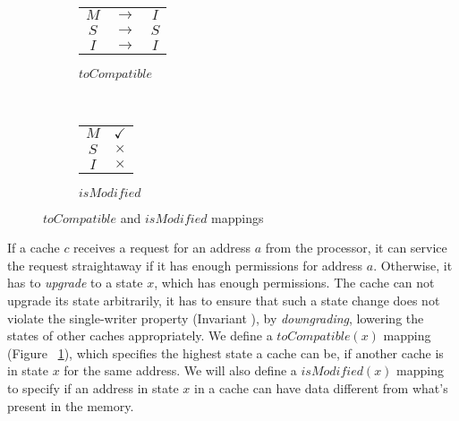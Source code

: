 \begin{wrapfigure}{r}{.46\linewidth}
\begin{subfigure}{.27\linewidth}
\centering
\begin{tabular}{|ccc|}
\hline
$M$ & $\rightarrow$ & $I$\\
$S$ & $\rightarrow$ & $S$\\
$I$ & $\rightarrow$ & $I$\\
\hline
\end{tabular}
\caption{$toCompatible$}
\label{toCompat}
\end{subfigure}
~~~~~~~~~~~~~~
\begin{subfigure}{.21\linewidth}
\centering
\begin{tabular}{|c|c|}
\hline
$M$ & $\checkmark$\\
$S$ & $\times$\\
$I$ & $\times$\\
\hline
\end{tabular}
\caption{$isModified$}
\label{isModified}
\end{subfigure}
\caption{$toCompatible$ and $isModified$ mappings}
\label{fig:msimap}
\end{wrapfigure}

If a cache $c$ receives a request for an address $a$ from the processor, it can
service the request straightaway if it has enough permissions for address $a$.
Otherwise, it has to \emph{upgrade} to a state $x$, which has enough
permissions. The cache can not upgrade its state arbitrarily, it has to ensure
that such a state change does not violate the single-writer property (Invariant
\label{singleWriter}), by \emph{downgrading}, \ie lowering the states of other
caches appropriately. We define a $toCompatible(x)$ mapping (Figure
~\ref{toCompat}), which specifies the highest state a cache can be, if another
cache is in state $x$ for the same address. We will also define a
$isModified(x)$ mapping to specify if an address in state $x$ in a cache can
have data different from what's present in the memory.


